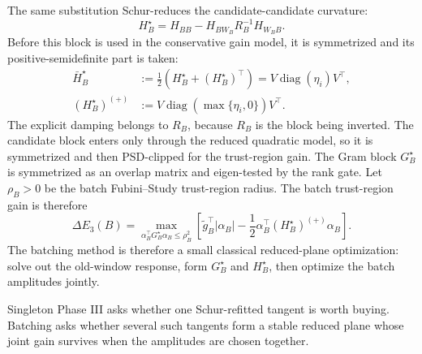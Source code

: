 \documentclass[10pt,twocolumn]{article}
\begin{document}
The same substitution Schur-reduces the candidate-candidate curvature:
\begin{equation}
H_B^\star
=
H_{BB}-H_{BW_B}R_B^{-1}H_{W_BB}.
\label{eq:p1_batch_schur_hessian}
\end{equation}
Before this block is used in the conservative gain model, it is symmetrized
and its positive-semidefinite part is taken:
\begin{equation}
\begin{aligned}
\bar H_B^\star
&:=
\frac12\left(H_B^\star+(H_B^\star)^\top\right)
=V\operatorname{diag}(\eta_i)V^\top,\\
(H_B^\star)^{(+)}
&:=
V\operatorname{diag}(\max\{\eta_i,0\})V^\top .
\end{aligned}
\label{eq:p1_batch_psd_part}
\end{equation}
The explicit damping belongs to \(R_B\), because \(R_B\) is the block being
inverted.  The candidate block enters only through the reduced quadratic
model, so it is symmetrized and then PSD-clipped for the trust-region gain.
The Gram block \(G_B^\star\) is
symmetrized as an overlap matrix and eigen-tested by the rank gate.
Let \(\rho_B>0\) be the batch Fubini--Study trust-region radius.  The batch
trust-region gain is therefore
\begin{equation}
\boxed{
\Delta E_3(B)
=
\max_{\alpha_B^\top G_B^\star\alpha_B\le\rho_B^2}
\left[
\widetilde g_B^\top|\alpha_B|
-\frac12\alpha_B^\top (H_B^\star)^{(+)}\alpha_B
\right].
}
\label{eq:p1_batch_gain}
\end{equation}
The batching method is therefore a small classical reduced-plane optimization:
solve out the old-window response, form \(G_B^\star\) and \(H_B^\star\), then
optimize the batch amplitudes jointly.

\begin{intuitionbox}
Singleton Phase III asks whether one Schur-refitted tangent is worth buying.
Batching asks whether several such tangents form a stable reduced plane whose
joint gain survives when the amplitudes are chosen together.
\end{intuitionbox}
\end{document}
